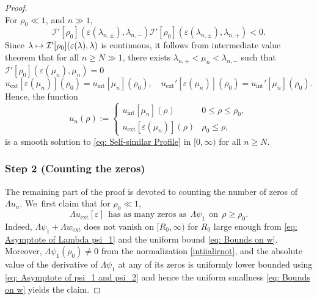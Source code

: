 \documentclass[10pt]{amsart}
\newcommand\mto{\mathchoice{\longmapsto}{\mapsto}{\mapsto}{\mapsto}}
\theoremstyle{plain}
\theoremstyle{definition}
\DeclareMathOperator{\exterior}{ext}
\DeclareMathOperator{\interior}{int}
\begin{document}
\begin{proof}
\[\]
For $\rho_0\ll 1$, and $n\gg 1$,
\[
\mathcal I'[\rho_0](\varepsilon(\lambda_{n,\pm}),\lambda_{n,-})\mathcal I'[\rho_0](\varepsilon(\lambda_{n,\pm}),\lambda_{n,+})<0.
\]
Since $\lambda\mto \mathcal I'[\rho_0](\varepsilon(\lambda),\lambda)$ is continuous, it follows from intermediate value theorem that for all $n\ge N\gg1$, there exists $\lambda_{n,+}<\mu_n<\lambda_{n,-}$ such that $\mathcal I'[\rho_0](\varepsilon(\mu_n),\mu_n)=0$ \ie
\[
u_{\exterior}[\varepsilon (\mu_n)](\rho_0)=u_{\interior}[\mu_n](\rho_0),\quad u_{\exterior}'[\varepsilon (\mu_n)](\rho_0)=u_{\interior}'[\mu_n](\rho_0).
\]
Hence, the function
\[
u_n(\rho):=\begin{cases}
u_{\interior}[\mu_n](\rho) & 0\le \rho\le \rho_0,\\
u_{\exterior}[\varepsilon(\mu_n)](\rho) & \rho_0\le \rho,
\end{cases}
\]
is a smooth solution to \eqref{eq: Self-similar Profile} in $[0,\infty)$ for all $n\ge N$.

\subsubsection*{Step 2 (Counting the zeros)}
The remaining part of the proof is devoted to counting the number of zeros of $\Lambda u_n$. We~first claim that for $\rho_0\ll1$,
\begin{equation}
\label{cenjnenoeo}
\Lambda u_{\exterior}[\varepsilon]\ \ \mbox{has as many zeros as}\ \ \Lambda\psi_1 \ \ \mbox{on}\ \ \rho\geq \rho_0.
\end{equation}
Indeed, $\Lambda \psi_1+\Lambda w_{\exterior}$ does not vanish on $[R_0,\infty)$ for $R_0$ large enough from \eqref{eq: Asymptote of Lambda psi_1} and the uniform bound \eqref{eq: Bounds on w}. Moreover, $\Lambda\psi_1(\rho_0)\neq 0$ from the normalization \eqref{intiialirnot}, and the absolute value of the derivative of $\Lambda\psi_1$ at any of its zeros is uniformly lower bounded using \eqref{eq: Asymptote of psi_1 and psi_2} and hence the uniform smallness \eqref{eq: Bounds on w} yields the claim.


\end{proof}
\end{document}
